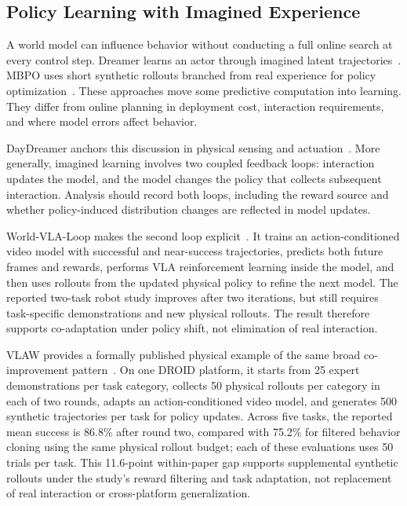\subsection{Policy Learning with Imagined Experience}
A world model can influence behavior without conducting a full online search at every control step. Dreamer learns an actor through imagined latent trajectories~\cite{hafner2020dreamer}. MBPO uses short synthetic rollouts branched from real experience for policy optimization~\cite{janner2019mbpo}. These approaches move some predictive computation into learning. They differ from online planning in deployment cost, interaction requirements, and where model errors affect behavior.

DayDreamer anchors this discussion in physical sensing and actuation~\cite{wu2023daydreamer}. More generally, imagined learning involves two coupled feedback loops: interaction updates the model, and the model changes the policy that collects subsequent interaction. Analysis should record both loops, including the reward source and whether policy-induced distribution changes are reflected in model updates.

World-VLA-Loop makes the second loop explicit~\cite{liu2026worldvlaloop}. It trains an action-conditioned video model with successful and near-success trajectories, predicts both future frames and rewards, performs VLA reinforcement learning inside the model, and then uses rollouts from the updated physical policy to refine the next model. The reported two-task robot study improves after two iterations, but still requires task-specific demonstrations and new physical rollouts. The result therefore supports co-adaptation under policy shift, not elimination of real interaction.

VLAW provides a formally published physical example of the same broad co-improvement pattern~\cite{guo2026vlaw}. On one DROID platform, it starts from 25 expert demonstrations per task category, collects 50 physical rollouts per category in each of two rounds, adapts an action-conditioned video model, and generates 500 synthetic trajectories per task for policy updates. Across five tasks, the reported mean success is 86.8\% after round two, compared with 75.2\% for filtered behavior cloning using the same physical rollout budget; each of these evaluations uses 50 trials per task. This 11.6-point within-paper gap supports supplemental synthetic rollouts under the study's reward filtering and task adaptation, not replacement of real interaction or cross-platform generalization.

